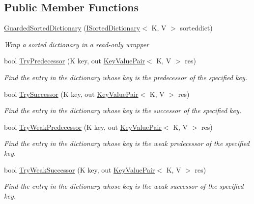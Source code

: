 \subsection*{Public Member Functions}
\begin{DoxyCompactItemize}
\item 
\hyperlink{class_c5_1_1_guarded_sorted_dictionary_a8087ccd945c7ead84c3dd794a78862a7}{Guarded\+Sorted\+Dictionary} (\hyperlink{interface_c5_1_1_i_sorted_dictionary}{I\+Sorted\+Dictionary}$<$ K, V $>$ sorteddict)
\begin{DoxyCompactList}\small\item\em Wrap a sorted dictionary in a read-\/only wrapper \end{DoxyCompactList}\item 
bool \hyperlink{class_c5_1_1_guarded_sorted_dictionary_a30ff56d7b975cb88ebd4581b25211d0b}{Try\+Predecessor} (K key, out \hyperlink{struct_c5_1_1_key_value_pair}{Key\+Value\+Pair}$<$ K, V $>$ res)
\begin{DoxyCompactList}\small\item\em Find the entry in the dictionary whose key is the predecessor of the specified key. \end{DoxyCompactList}\item 
bool \hyperlink{class_c5_1_1_guarded_sorted_dictionary_a40570bde5231945710618a5c4d861a09}{Try\+Successor} (K key, out \hyperlink{struct_c5_1_1_key_value_pair}{Key\+Value\+Pair}$<$ K, V $>$ res)
\begin{DoxyCompactList}\small\item\em Find the entry in the dictionary whose key is the successor of the specified key. \end{DoxyCompactList}\item 
bool \hyperlink{class_c5_1_1_guarded_sorted_dictionary_acc1c73977c59c65b03fcd78c6d21cf55}{Try\+Weak\+Predecessor} (K key, out \hyperlink{struct_c5_1_1_key_value_pair}{Key\+Value\+Pair}$<$ K, V $>$ res)
\begin{DoxyCompactList}\small\item\em Find the entry in the dictionary whose key is the weak predecessor of the specified key. \end{DoxyCompactList}\item 
bool \hyperlink{class_c5_1_1_guarded_sorted_dictionary_ad899ac9b2f1cc203bca856d2f56783f7}{Try\+Weak\+Successor} (K key, out \hyperlink{struct_c5_1_1_key_value_pair}{Key\+Value\+Pair}$<$ K, V $>$ res)
\begin{DoxyCompactList}\small\item\em Find the entry in the dictionary whose key is the weak successor of the specified key. \end{DoxyCompactList}\item 

\end{DoxyCompactItemize}

